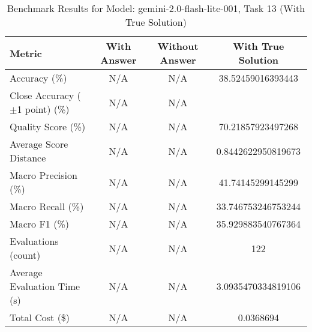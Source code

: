 \begin{table}[htbp]
\centering
\caption{Benchmark Results for Model: gemini-2.0-flash-lite-001, Task 13 (With True Solution)}
\begin{tabular}{lccc}
\toprule
\textbf{Metric} & \textbf{With Answer} & \textbf{Without Answer} & \textbf{With True Solution} \\
\midrule
Accuracy (\%) & N/A & N/A & 38.52459016393443 \\
Close Accuracy ($\pm$1 point) (\%) & N/A & N/A \\
Quality Score (\%) & N/A & N/A & 70.21857923497268 \\
Average Score Distance & N/A & N/A & 0.8442622950819673 \\
Macro Precision (\%) & N/A & N/A & 41.74145299145299 \\
Macro Recall (\%) & N/A & N/A & 33.746753246753244 \\
Macro F1 (\%) & N/A & N/A & 35.929883540767364 \\
Evaluations (count) & N/A & N/A & 122 \\
Average Evaluation Time (s) & N/A & N/A & 3.0935470334819106 \\
Total Cost (\$) & N/A & N/A & 0.0368694 \\
\bottomrule
\end{tabular}
\end{table}